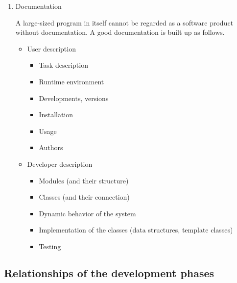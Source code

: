 \documentclass[margin=0px]{article}
\begin{document}
\begin{enumerate}
    \item Documentation

          A large-sized program in itself cannot be regarded as a software product
          without documentation. A good documentation is built up as follows.
          \begin{itemize}
              \item User description
                    \begin{itemize}
                        \item Task description
                        \item Runtime environment
                        \item Developments, versions
                        \item Installation
                        \item Usage
                        \item Authors
                    \end{itemize}
              \item Developer description
                    \begin{itemize}
                        \item Modules (and their structure)
                        \item Classes (and their connection)
                        \item Dynamic behavior of the system
                        \item Implementation of the classes (data structures, template classes)
                        \item Testing
                    \end{itemize}
          \end{itemize}
\end{enumerate}

\subsection{Relationships of the development phases}
\end{document}
